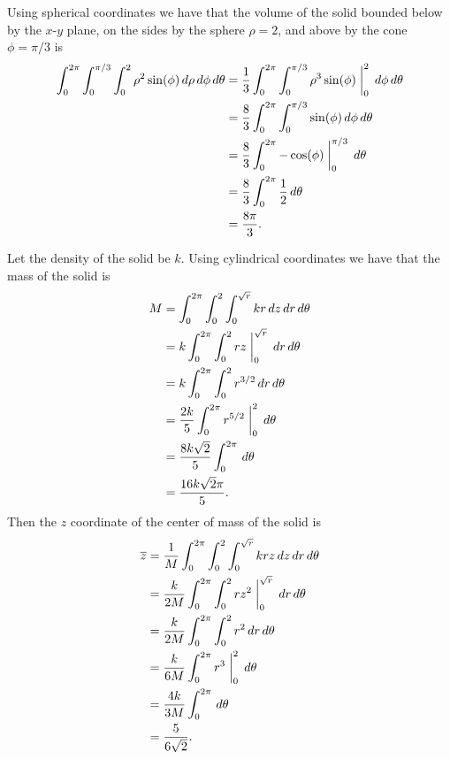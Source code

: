 \begin{exercises}
\begin{exerciseSolution}
	\item Using spherical coordinates we have that the volume of the solid bounded below by the $x$-$y$ plane, on the sides by the sphere $\rho=2
$, and above by the cone $\phi = \pi/3$ is
\begin{align*}
\int_{0}^{2\pi} \int_{0}^{\pi/3} \int_{0}^{2} \rho^2 \sin(\phi) \, d\rho \, d\phi \, d\theta &= \frac{1}{3} \int_{0}^{2\pi} \int_{0}^{\pi/3}  \rho^3 \sin(\phi) \biggm|_{0}^{2} \, d\phi \, d\theta  \\
	&= \frac{8}{3} \int_{0}^{2\pi} \int_{0}^{\pi/3}  \sin(\phi)  \, d\phi \, d\theta  \\
	&= \frac{8}{3} \int_{0}^{2\pi}   -\cos(\phi) \biggm|_{0}^{\pi/3}  \, d\theta  \\
	&= \frac{8}{3} \int_{0}^{2\pi}  \frac{1}{2}  \, d\theta  \\
	&= \frac{8\pi}{3}.
\end{align*}

	\item Let the density of the solid be $k$. Using cylindrical coordinates we have that the mass of the solid is
\begin{align*}
M &= \int_{0}^{2\pi} \int_{0}^{2} \int_{0}^{\sqrt{r}} kr \, dz \, dr \, d\theta \\
	&= k\int_{0}^{2\pi} \int_{0}^{2} rz\biggm|_{0}^{\sqrt{r}} \, dr \, d\theta \\
	&= k\int_{0}^{2\pi} \int_{0}^{2}  r^{3/2} \, dr \, d\theta \\
	&= \frac{2k}{5} \int_{0}^{2\pi} r^{5/2}\biggm|_{0}^{2}  \, d\theta \\
	&= \frac{8k\sqrt{2}}{5} \int_{0}^{2\pi} \, d\theta \\
	&= \frac{16k\sqrt{2}\pi}{5}.
\end{align*}
Then the $z$ coordinate of the center of mass of the solid is 
\begin{align*}
\overline{z} &= \frac{1}{M}  \int_{0}^{2\pi} \int_{0}^{2} \int_{0}^{\sqrt{r}} krz \, dz \, dr \, d\theta \\
	&= \frac{k}{2M} \int_{0}^{2\pi} \int_{0}^{2} rz^2\biggm|_{0}^{\sqrt{r}} \, dr \, d\theta \\
	&= \frac{k}{2M}\int_{0}^{2\pi} \int_{0}^{2}  r^2 \, dr \, d\theta \\
	&= \frac{k}{6M} \int_{0}^{2\pi} r^{3}\biggm|_{0}^{2}  \, d\theta \\
	&= \frac{4k}{3M} \int_{0}^{2\pi} \, d\theta \\
	&= \frac{5}{6\sqrt{2}}.
\end{align*}



\end{exerciseSolution}
\end{exercises}
